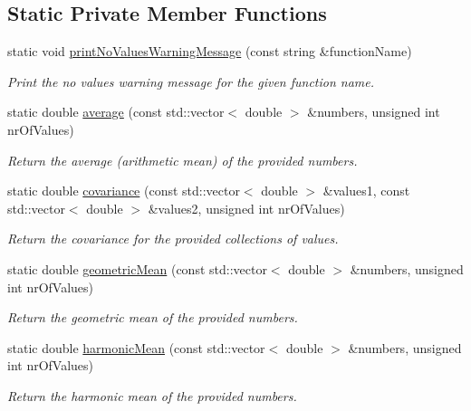 \subsection*{\-Static \-Private \-Member \-Functions}
\begin{DoxyCompactItemize}
\item 
static void \hyperlink{classmultiscale_1_1Numeric_afc1b351417949b1806e9faca7156d1a7}{print\-No\-Values\-Warning\-Message} (const string \&function\-Name)
\begin{DoxyCompactList}\small\item\em \-Print the no values warning message for the given function name. \end{DoxyCompactList}\item 
static double \hyperlink{classmultiscale_1_1Numeric_a0b02b3eadc399bb8d6a0d8cc3e5d9cf6}{average} (const std\-::vector$<$ double $>$ \&numbers, unsigned int nr\-Of\-Values)
\begin{DoxyCompactList}\small\item\em \-Return the average (arithmetic mean) of the provided numbers. \end{DoxyCompactList}\item 
static double \hyperlink{classmultiscale_1_1Numeric_acc3adb44062cc1e70f697bd072e69b3b}{covariance} (const std\-::vector$<$ double $>$ \&values1, const std\-::vector$<$ double $>$ \&values2, unsigned int nr\-Of\-Values)
\begin{DoxyCompactList}\small\item\em \-Return the covariance for the provided collections of values. \end{DoxyCompactList}\item 
static double \hyperlink{classmultiscale_1_1Numeric_aaf89a75c6e933cd6e736f2ba4db0f76f}{geometric\-Mean} (const std\-::vector$<$ double $>$ \&numbers, unsigned int nr\-Of\-Values)
\begin{DoxyCompactList}\small\item\em \-Return the geometric mean of the provided numbers. \end{DoxyCompactList}\item 
static double \hyperlink{classmultiscale_1_1Numeric_a5d8213db60a274b34b0fa69ce7f02490}{harmonic\-Mean} (const std\-::vector$<$ double $>$ \&numbers, unsigned int nr\-Of\-Values)
\begin{DoxyCompactList}\small\item\em \-Return the harmonic mean of the provided numbers. \end{DoxyCompactList}\item 

\end{DoxyCompactItemize}
